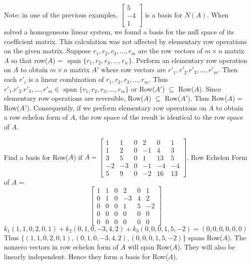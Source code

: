 \documentclass[12pt]{article}
\begin{document}
Note: in one of the previous examples, $\begin{bmatrix} 5 \\ -4 \\ 1 \end{bmatrix}$ is a basis for $N(A)$. \newline 
When solved a homogeneous linear system, we found a basis for the null space of its coefficient matrix. This calculation was not affected by elementary row operations on the given matrix. \newline 
Suppose $r_1, r_2, r_3, \dots, r_m$ are the row vectors of $m \times n$ matrix $A$ so that row($A$) = $\text{ span }\{r_1, r_2, r_3, \dots, r_w\}$. Perform an elementary row operation on $A$ to obtain $m \times n$ matrix $A'$ where row vectors are $r'_1, r'_2. r'_3, \dots, r'_m$. Then each $r'_i$ is a linear combination of $r_1, r_2, r_3, \dots, r_m$. Thus $r'_1. r'_2. r'_3, \dots, r'_m \in \text{ span }\{r_1, r_2, r_3, \dots, r_m\}$ or Row($A'$) $\subseteq$ Row($A$). Since elementary row operations are reversible, Row($A$) $\subseteq$ Row($A'$). Thus Row($A$) = Row($A'$). Consequently, if we perform elementary row operations on $A$ to obtain a row echelon form of $A$, the row space of the result is identical to the row space of $A$. 
\begin{example} Find a basis for Row($A$) if $A = \begin{bmatrix}
1 & 1 & 0 & 2 & 0 & 1 \\
1 & 2 & 0 & -1 & 4 & 3 \\
3 & 5 & 0 & 1 & 13 & 5 \\
-2 & -3 & 0 & -1 & -4 & -4 \\
5 & 9 & 0 & -2 & 16 & 13
\end{bmatrix} $. \newline  Row Echelon Form of $A$ = $$\begin{bmatrix}
1 & 1 & 0 & 2 & 0 & 1 \\
0 & 1 & 0 & -3 & 4 & 2 \\
0 & 0 & 0 & 1 & 5 & -2 \\
0 & 0 & 0 & 0 & 0 & 0 \\
0 & 0 & 0 & 0 & 0 & 0
\end{bmatrix} $$ $$k_1(1, 1, 0, 2, 0, 1) + k_2(0, 1, 0, -3, 4, 2) + k_3(0, 0, 0, 1, 5, -2) = (0, 0, 0, 0, 0, 0) $$ Thus $\{(1, 1, 0, 2, 0, 1), (0, 1, 0, -3, 4, 2), (0, 0, 0, 1, 5, -2)\}$ spans Row($A$). The nonzero vectors in row echelon form of $A$ will span Row($A$). They will also be linearly independent. Hence they form a basis for Row($A$). \end{example} 
\end{document}
